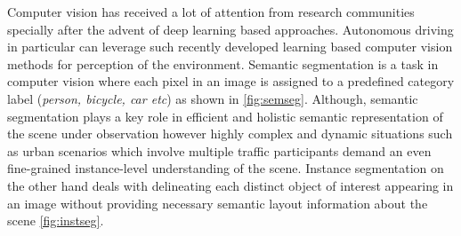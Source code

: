 Computer vision has received a lot of attention from research communities specially 
after the advent of deep learning based approaches. Autonomous driving in particular can
leverage such recently developed learning based computer vision methods for perception
of the environment. Semantic segmentation is a task in computer vision where each 
pixel in an image is assigned to a predefined category label (\textit{person, bicycle, car etc}) as shown in \ref{fig:semseg}.
Although, semantic segmentation plays a key role in efficient and holistic semantic 
representation of the scene under observation however highly complex and dynamic situations 
such as urban scenarios which involve multiple traffic participants demand 
an even fine-grained instance-level understanding of the scene. 
Instance segmentation on the other hand deals with delineating each distinct object 
of interest appearing in an image without providing necessary semantic layout information about the scene \ref{fig:instseg}.
